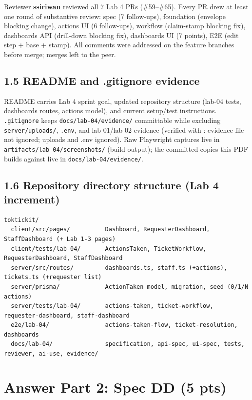 \documentclass[11pt,a4paper]{article}
\begin{document}
Reviewer \textbf{ssiriwan} reviewed all 7 Lab 4 PRs (\#59--\#65). Every PR drew at least one
round of substantive review: spec (7 follow-ups), foundation (envelope blocking change),
actions UI (6 follow-ups), workflow (claim-stamp blocking fix), dashboards API
(drill-down blocking fix), dashboards UI (7 points), E2E (edit step + base + stamp).
All comments were addressed on the feature branches before merge; merges left to the peer.

\subsection*{1.5 README and .gitignore evidence}
README carries Lab 4 sprint goal, updated repository structure (lab-04 tests, dashboards
routes, actions model), and current setup/test instructions.
\texttt{.gitignore} keeps \texttt{docs/lab-04/evidence/} committable while excluding
\texttt{server/uploads/}, \texttt{.env}, and lab-01/lab-02 evidence (verified with
: evidence file not ignored; uploads and .env ignored).
Raw Playwright captures live in \texttt{artifacts/lab-04/screenshots/} (build output);
the committed copies this PDF builds against live in \texttt{docs/lab-04/evidence/}.

\subsection*{1.6 Repository directory structure (Lab 4 increment)}
\begin{lstlisting}
toktickit/
  client/src/pages/          Dashboard, RequesterDashboard, StaffDashboard (+ Lab 1-3 pages)
  client/tests/lab-04/       ActionsTaken, TicketWorkflow, RequesterDashboard, StaffDashboard
  server/src/routes/         dashboards.ts, staff.ts (+actions), tickets.ts (+requester list)
  server/prisma/             ActionTaken model, migration, seed (0/1/N actions)
  server/tests/lab-04/       actions-taken, ticket-workflow, requester-dashboard, staff-dashboard
  e2e/lab-04/                actions-taken-flow, ticket-resolution, dashboards
  docs/lab-04/               specification, api-spec, ui-spec, tests, reviewer, ai-use, evidence/
\end{lstlisting}

\section*{Answer Part 2: Spec DD (5 pts)}
\end{document}
